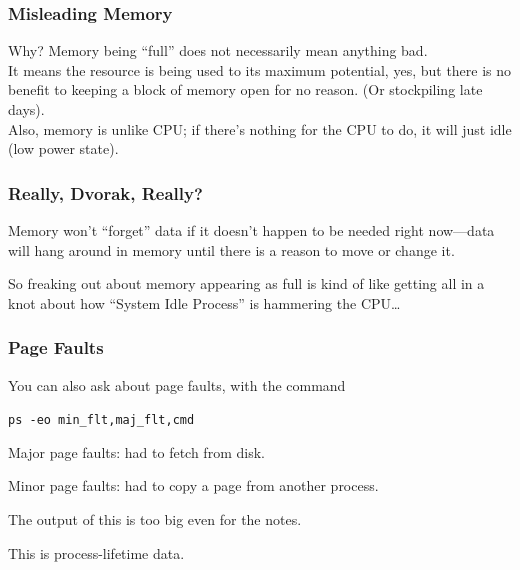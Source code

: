 \begin{frame}
\frametitle{Misleading Memory}

\large
\begin{changemargin}{1cm}
Why? Memory being ``full'' does not necessarily mean anything bad. \\[1em]

It means the resource is being used to its maximum potential, yes, but there is no benefit to keeping a block of memory open for no reason. (Or stockpiling late days).\\[1em]

Also, memory is unlike CPU; if there's nothing for the CPU to do, it will just idle (low power state).
\end{changemargin}

\end{frame}


\begin{frame}
\frametitle{Really, Dvorak, Really?}

\large
\begin{changemargin}{1cm}
Memory won't ``forget'' data if it doesn't happen to be needed right now---data will hang around in memory until there is a reason to move or change it. 

So freaking out about memory appearing as full is kind of like getting all in a knot about how ``System Idle Process'' is hammering the CPU\ldots
\end{changemargin}

\end{frame}




\begin{frame}
\frametitle{Page Faults}

\large
\begin{changemargin}{1cm}
You can also ask about page faults, with the command
\begin{center}
\texttt{ps -eo min\_flt,maj\_flt,cmd}
\end{center}

Major page faults: had to fetch from disk. 

Minor page faults: had to copy a page from another process. 

The output of this is too big even for the notes.

This is process-lifetime data.
\end{changemargin}
\end{frame}



